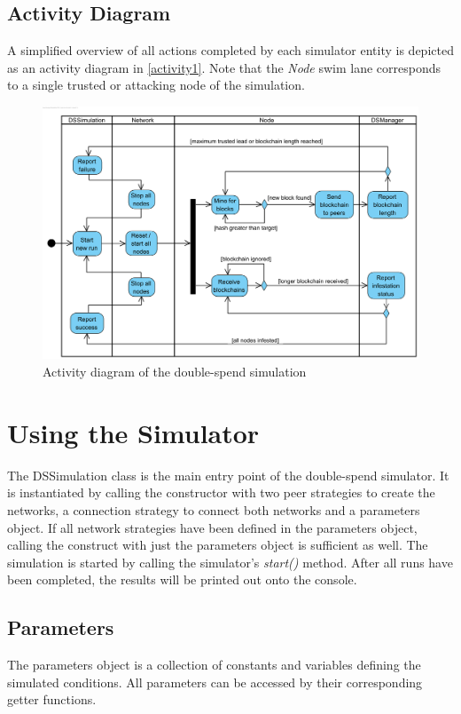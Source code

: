 \documentclass[a4paper,12pt,twoside]{report}
\begin{document}
\subsection{Activity Diagram}
A simplified overview of all actions completed by each simulator entity is depicted as an activity diagram in \autoref{activity1}. Note that the \textit{Node} swim lane corresponds to a single trusted or attacking node of the simulation.
\begin{figure}[ht]
	\centering
  \includegraphics[width=\textwidth]{Activity1.png}
	\caption{Activity diagram of the double-spend simulation}
	\label{activity1}
\end{figure}

\section{Using the Simulator}
The DSSimulation class is the main entry point of the double-spend simulator. It is instantiated by calling the constructor with two peer strategies to create the networks, a connection strategy to connect both networks and a parameters object. If all network strategies have been defined in the parameters object, calling the construct with just the parameters object is sufficient as well. The simulation is started by calling the simulator's \textit{start()} method. After all runs have been completed, the results will be printed out onto the console. 
\subsection{Parameters}
The parameters object is a collection of constants and variables defining the simulated conditions. All parameters can be accessed by their corresponding getter functions.
\end{document}
